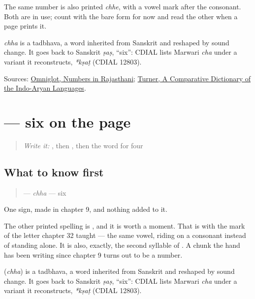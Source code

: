 The same number is also printed \emph{chhe}, with a vowel mark after the consonant. Both are in use; count with the bare form for now and read the other when a page prints it.

\begin{cousinweb}
\emph{chha} is a tadbhava, a word inherited from Sanskrit and reshaped by sound change. It goes back to Sanskrit \emph{ṣaṣ}, \textquotedblleft{}six\textquotedblright{}: CDIAL lists Marwari \emph{cha} under a variant it reconstructs, \emph{*kṣaṭ} (CDIAL 12803).
\end{cousinweb}

\begin{tcolorbox}[breakable,colback=teal!4,colframe=teal!35!black,title={Before you move on}]
Sources: \href{https://www.omniglot.com/language/numbers/rajasthani.htm}{Omniglot, Numbers in Rajasthani}; \href{https://dsal.uchicago.edu/dictionaries/soas/}{Turner, A Comparative Dictionary of the Indo-Aryan Languages}.
\end{tcolorbox}
\section[\texorpdfstring{\mw{छ} (chha)}{छ (chha)}]{ — six on the page}

\label{lesson:MW-C33-chha}



\begin{quote}
\emph{Write it:} \textbf{}, then \textbf{}, then the word for four
\end{quote}

\subsection*{What to know first}
\begin{quote}
\textbf{} — \emph{chha} — six
\end{quote}

One sign, made in chapter 9, and nothing added to it.

The other printed spelling is \textbf{}, and it is worth a moment. That is \textbf{} with the mark of the letter chapter 32 taught — the same vowel, riding on a consonant instead of standing alone. It is also, exactly, the second syllable of \textbf{}. A chunk the hand has been writing since chapter 9 turns out to be a number.

\begin{cousinweb}
\textbf{} (\emph{chha}) is a tadbhava, a word inherited from Sanskrit and reshaped by sound change. It goes back to Sanskrit \emph{ṣaṣ}, \textquotedblleft{}six\textquotedblright{}: CDIAL lists Marwari \emph{cha} under a variant it reconstructs, \emph{*kṣaṭ} (CDIAL 12803).
\end{cousinweb}

